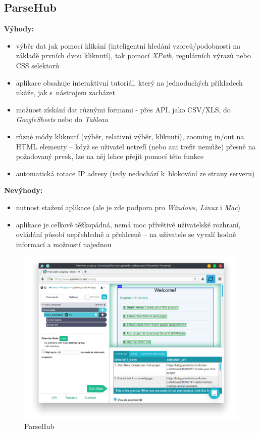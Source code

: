 \documentclass[thesis=B,czech]{FITthesis}[2012/06/26]
\begin{document}
\subsection{ParseHub}
\textbf{Výhody:}
\begin{itemize}
	\item výběr dat jak pomocí klikání (inteligentní hledání vzorců/podobností na základě prvních dvou kliknutí), tak pomocí \emph{XPath}, regulárních výrazů nebo CSS selektorů
	\item aplikace obsahuje interaktivní tutoriál, který na jednoduchých příkladech ukáže, jak s~nástrojem zacházet
	\item možnost získání dat různými formami - přes API, jako CSV/XLS, do \emph{GoogleSheets} nebo do \emph{Tableau}
	\item různé módy kliknutí (výběr, relativní výběr, kliknutí), zooming in/out na HTML elementy -- když se uživatel netrefí (nebo ani trefit nemůže) přesně na požadovaný prvek, lze na něj lehce přejít pomocí této funkce
	\item automatická rotace IP adresy (tedy nedochází k~blokování ze strany serveru)
\end{itemize}
\textbf{Nevýhody:}
\begin{itemize}
	\item nutnost stažení aplikace (ale je zde podpora pro \emph{Windows, Linux} i \emph{Mac})
	\item aplikace je celkově těžkopádná, nemá moc přívětivé uživatelské rozhraní, ovládání působí nepřehledně a přehlceně -- na uživatele se vyvalí hodně informací a možností najednou
\end{itemize}
\begin{figure}[h]
	\includegraphics[width=\linewidth]{images/ParseHub.png}
	\caption{ParseHub}
	\label{fig:parseHub}
\end{figure}
\end{document}
